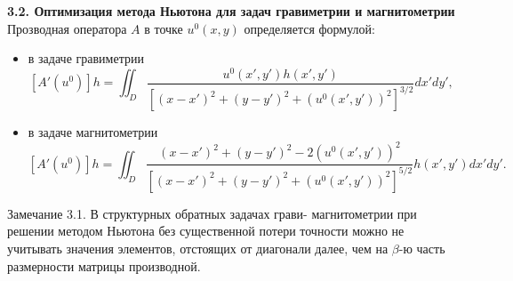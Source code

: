 \documentclass[10pt,pdf, mathserif, hyperref={unicode}]{beamer}
\begin{document}
\begin{frame}{\small\textbf{3.2. Оптимизация метода Ньютона для задач гравиметрии и магнитометрии}}
	Прозводная оператора $A$ в точке $u^0(x,y)$ определяется формулой:
	\begin{itemize}
		\item в задаче гравиметрии
		$$ [A'(u^0)]h=\iint_{D} \frac{u^0(x',y')h(x',y')}{[(x-x')^2+(y-y')^2+(u^0(x',y'))^2]^{3/2}}dx'dy',$$
		\item в задаче магнитометрии
		$$ [A'(u^0)]h=\iint_{D} \frac{(x-x')^2+(y-y')^2-2(u^0(x',y'))^2}{[(x-x')^2+(y-y')^2+(u^0(x',y'))^2]^{5/2}}h(x',y')dx'dy'.$$
	\end{itemize}

\begin{block}{Замечание 3.1.}
	В структурных обратных задачах грави- магнитометрии при решении методом Ньютона без существенной потери точности можно не учитывать значения элементов, отстоящих от диагонали далее, чем на  $\beta$-ю часть  размерности матрицы производной.
\end{block}
\let\thefootnote\relax\let\thefootnote\relax{}
\end{frame}
\end{document}
